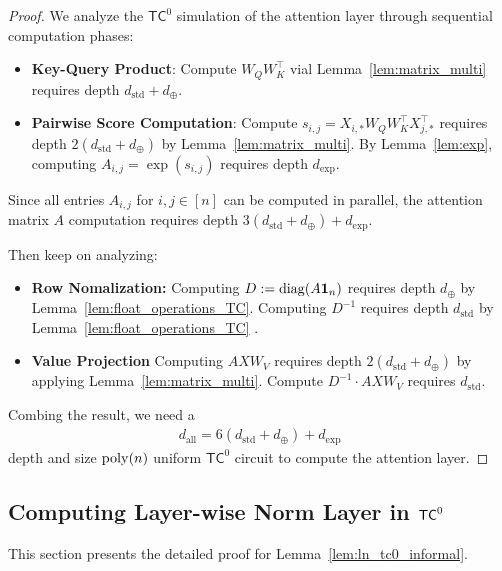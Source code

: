 \begin{proof}
    We analyze the $\mathsf{TC}^0$ simulation of the attention layer through sequential computation phases:
    \begin{itemize}
        \item {\bf Key-Query Product}: Compute $W_QW_K^\top$ vial Lemma~\ref{lem:matrix_multi} requires depth $d_{\mathrm{std}} + d_{\oplus}$.
        \item {\bf Pairwise Score Computation}: Compute $s_{i,j} = X_{i,*}   W_Q   W_K^\top   X_{j,*}^\top$ requires depth $2(d_{\mathrm{std}} + d_{\oplus})$ by Lemma~\ref{lem:matrix_multi}. By  Lemma~\ref{lem:exp}, computing $A_{i,j} = \exp(s_{i,j})$ requires depth $d_{\exp}$. 
    \end{itemize}
    Since all entries $A_{i,j}$ for $i, j \in [n]$ can be computed in parallel, the attention matrix $A$ computation requires depth $3(d_{\mathrm{std}} + d_{\oplus}) + d_{\exp}$.

    Then keep on analyzing:
    \begin{itemize}
        \item {\bf Row Nomalization:} Computing $D:=\operatorname{diag}(A{\bf 1}_n)$ requires depth $d_{\oplus}$ by Lemma~\ref{lem:float_operations_TC}. Computing $D^{-1}$ requires depth $d_{\mathrm{std}}$ by Lemma~\ref{lem:float_operations_TC} .
        \item {\bf Value Projection} Computing $AXW_V$ requires depth $2(d_{\mathrm{std}} + d_{\oplus})$ by applying Lemma~\ref{lem:matrix_multi}. Compute $D^{-1} \cdot A X W_V$ requires $d_{\mathrm{std}}$.
    \end{itemize}

    Combing the result, we need a
    \begin{align*}
        d_{\mathrm{all}} = 6(d_{\mathrm{std}} + d_{\oplus}) + d_{\exp}
    \end{align*}
    depth and size $\operatorname{poly}(n)$ uniform $\mathsf{TC}^0$ circuit to compute the attention layer.
\end{proof}

\subsection{Computing Layer-wise Norm Layer in \texorpdfstring{$\mathsf{TC}^0$}{} }\label{sec:app_ln_tc0}
This section presents the detailed proof for Lemma~\ref{lem:ln_tc0_informal}.



